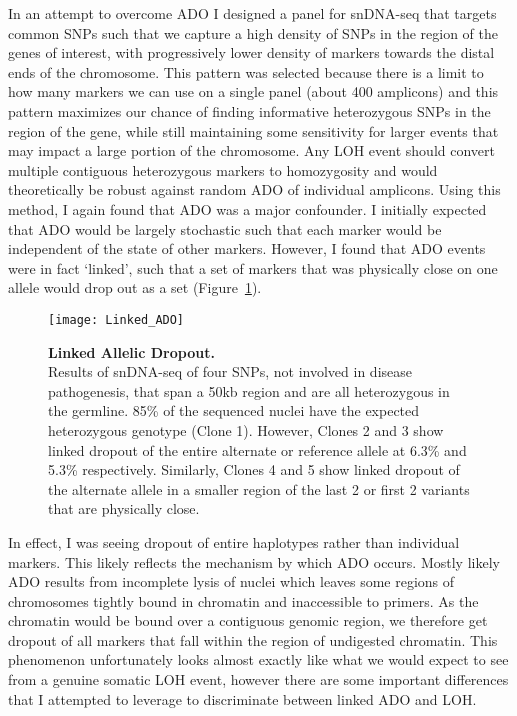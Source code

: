In an attempt to overcome ADO I designed a panel for snDNA-seq that targets common SNPs such that we capture a high density of SNPs in the region of the genes of interest, with progressively lower density of markers towards the distal ends of the chromosome. This pattern was selected because there is a limit to how many markers we can use on a single panel (about 400 amplicons) and this pattern maximizes our chance of finding informative heterozygous SNPs in the region of the gene, while still maintaining some sensitivity for larger events that may impact a large portion of the chromosome. Any LOH event should convert multiple contiguous heterozygous markers to homozygosity and would theoretically be robust against random ADO of individual amplicons. Using this method, I again found that ADO was a major confounder. I initially expected that ADO would be largely stochastic such that each marker would be independent of the state of other markers. However, I found that ADO events were in fact `linked', such that a set of markers that was physically close on one allele would drop out as a set (Figure~\ref{Linked_ADO}). 
\begin{figure}[tbp!]
\begin{center}
\texttt{[image: Linked\_ADO]}
\end{center}
\caption[Linked Allelic Dropout]{\textbf{Linked Allelic Dropout.} \\  Results of snDNA-seq of four SNPs, not involved in disease pathogenesis, that span a 50kb region and are all heterozygous in the germline. 85\% of the sequenced nuclei have the expected heterozygous genotype (Clone 1). However, Clones 2 and 3 show linked dropout of the entire alternate or reference allele at 6.3\% and 5.3\% respectively. Similarly, Clones 4 and 5 show linked dropout of the alternate allele in a smaller region of the last 2 or first 2 variants that are physically close.}
\label{Linked_ADO}
\end{figure}
In effect, I was seeing dropout of entire haplotypes rather than individual markers. This likely reflects the mechanism by which ADO occurs. Mostly likely ADO results from incomplete lysis of nuclei which leaves some regions of chromosomes tightly bound in chromatin and inaccessible to primers. As the chromatin would be bound over a contiguous genomic region, we therefore get dropout of all markers that fall within the region of undigested chromatin.  This phenomenon unfortunately looks almost exactly like what we would expect to see from a genuine somatic LOH event, however there are some important differences that I attempted to leverage to discriminate between linked ADO and LOH. 

